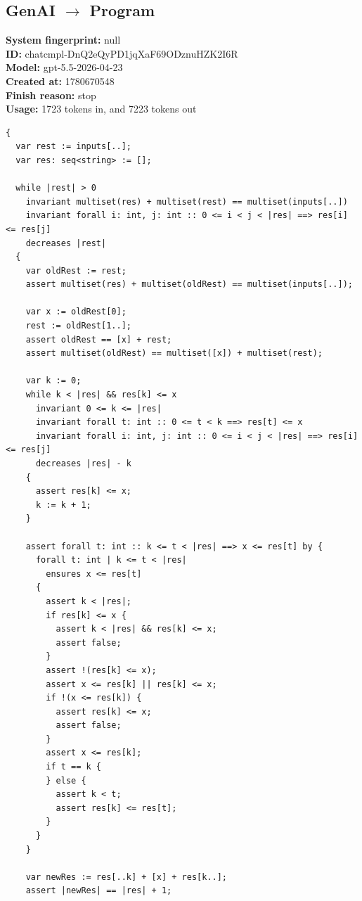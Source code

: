\documentclass{article}
\begin{document}
\subsection*{GenAI $\rightarrow$ Program}
\textbf{System fingerprint: }null
\\\textbf{ID: }chatcmpl-DnQ2eQyPD1jqXaF69ODznuHZK2I6R
\\\textbf{Model: }gpt-5.5-2026-04-23
\\\textbf{Created at: }1780670548
\\\textbf{Finish reason: }stop
\\\textbf{Usage: }1723 tokens in, and 7223 tokens out
\begin{lstlisting}
{
  var rest := inputs[..];
  var res: seq<string> := [];

  while |rest| > 0
    invariant multiset(res) + multiset(rest) == multiset(inputs[..])
    invariant forall i: int, j: int :: 0 <= i < j < |res| ==> res[i] <= res[j]
    decreases |rest|
  {
    var oldRest := rest;
    assert multiset(res) + multiset(oldRest) == multiset(inputs[..]);

    var x := oldRest[0];
    rest := oldRest[1..];
    assert oldRest == [x] + rest;
    assert multiset(oldRest) == multiset([x]) + multiset(rest);

    var k := 0;
    while k < |res| && res[k] <= x
      invariant 0 <= k <= |res|
      invariant forall t: int :: 0 <= t < k ==> res[t] <= x
      invariant forall i: int, j: int :: 0 <= i < j < |res| ==> res[i] <= res[j]
      decreases |res| - k
    {
      assert res[k] <= x;
      k := k + 1;
    }

    assert forall t: int :: k <= t < |res| ==> x <= res[t] by {
      forall t: int | k <= t < |res|
        ensures x <= res[t]
      {
        assert k < |res|;
        if res[k] <= x {
          assert k < |res| && res[k] <= x;
          assert false;
        }
        assert !(res[k] <= x);
        assert x <= res[k] || res[k] <= x;
        if !(x <= res[k]) {
          assert res[k] <= x;
          assert false;
        }
        assert x <= res[k];
        if t == k {
        } else {
          assert k < t;
          assert res[k] <= res[t];
        }
      }
    }

    var newRes := res[..k] + [x] + res[k..];
    assert |newRes| == |res| + 1;


\end{lstlisting}
\end{document}
